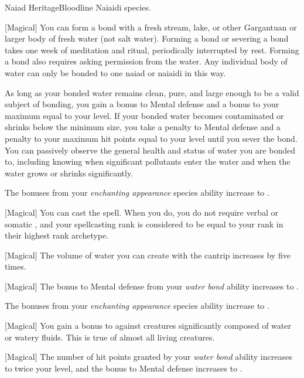     \begin{feat}{Naiad Heritage}{Bloodline}
        \featpre Naiaidi species.

        [Magical] You can form a bond with a fresh stream, lake, or other Gargantuan or larger body of fresh water (not salt water).
        Forming a bond or severing a bond takes one week of meditation and ritual, periodically interrupted by rest.
        Forming a bond also requires asking permission from the water.
        Any individual body of water can only be bonded to one naiad or naiaidi in this way.

        As long as your bonded water remains clean, pure, and large enough to be a valid subject of bonding, you gain a  bonus to Mental defense and a bonus to your maximum  equal to your level.
        If your bonded water becomes contaminated or shrinks below the minimum size, you take a  penalty to Mental defense and a penalty to your maximum hit points equal to your level until you sever the bond.
        You can passively observe the general health and status of water you are bonded to, including knowing when significant pollutants enter the water and when the water grows or shrinks significantly.

         The bonuses from your \textit{enchanting appearance} species ability increase to .

        [Magical] You can cast the  spell.
        When you do, you do not require verbal or somatic , and your spellcasting rank is considered to be equal to your rank in their highest rank archetype.

        [Magical] The volume of water you can create with the  cantrip increases by five times.

        [Magical] The bonus to Mental defense from your \textit{water bond} ability increases to .

         The bonuses from your \textit{enchanting appearance} species ability increase to .

        [Magical] You gain a  bonus to  against creatures significantly composed of water or watery fluids.
        This is true of almost all living creatures.

        [Magical] The number of hit points granted by your \textit{water bond} ability increases to twice your level, and the bonus to Mental defense increases to .
    \end{feat}

